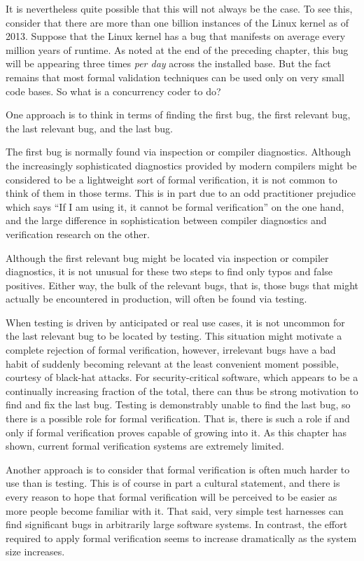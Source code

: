 It is nevertheless quite possible that this will not always be the case.
To see this, consider that there are more than one billion instances
of the Linux kernel as of 2013.
Suppose that the Linux kernel has a bug that manifests on average every million
years of runtime.
As noted at the end of the preceding chapter,
this bug will be appearing three times \emph{per day} across the installed
base.
But the fact remains that most formal validation techniques can be used
only on very small code bases.
So what is a concurrency coder to do?

One approach is to think in terms of finding the first bug, the first
relevant bug, the last relevant bug, and the last bug.

The first bug is normally found via inspection or compiler diagnostics.
Although the increasingly sophisticated diagnostics provided by modern
compilers might be considered to be a lightweight sort of formal
verification, it is not common to think of them in those terms.
This is in part due to an odd practitioner prejudice which says
``If I am using it, it cannot be formal verification'' on the one
hand, and the large difference in sophistication between compiler
diagnostics and verification research on the other.

Although the first relevant bug might be located via inspection or
compiler diagnostics, it is not unusual for these two steps to find
only typos and false positives.
Either way, the bulk of the relevant bugs, that is, those bugs that
might actually be encountered in production, will often be found via testing.

When testing is driven by anticipated or real use cases, it is not
uncommon for the last relevant bug to be located by testing.
This situation might motivate a complete rejection of formal verification,
however, irrelevant bugs have a bad habit of suddenly becoming relevant
at the least convenient moment possible, courtesy of black-hat attacks.
For security-critical software, which appears to be a continually
increasing fraction of the total, there can thus be strong motivation
to find and fix the last bug.
Testing is demonstrably unable to find the last bug, so there is a
possible role for formal verification.
That is, there is such a role if and only if formal verification
proves capable of growing into it.
As this chapter has shown, current formal verification systems are
extremely limited.

Another approach is to consider that
formal verification is often much harder to use than is testing.
This is of course in part a cultural statement, and there is every reason
to hope that formal verification will be perceived to be easier as more
people become familiar with it.
That said, very simple test harnesses can find significant bugs in arbitrarily
large software systems.
In contrast, the effort required to apply formal verification seems to
increase dramatically as the system size increases.

